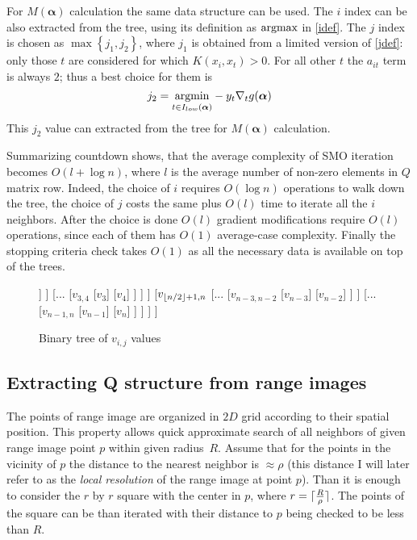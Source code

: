 For $M(\bm{\alpha})$ calculation the same data structure can be used. The $i$ index can be also extracted from the tree, using its definition as $\operatorname{argmax}$ in \ref{idef}. The $j$ index is chosen as $\max\left\{j_1, j_2\right\}$, where $j_1$ is obtained 
from a limited version of \ref{jdef}: only those $t$ are considered for which $K(x_i, x_t) > 0$. For all other $t$ the $a_{it}$ term is always $2$; thus a best choice for them is
\begin{equation}
j_2 = \underset{t \in I_{low}(\bm{\alpha})}{\operatorname{argmin}} -y_t \nabla_t g(\bm{\alpha})
\end{equation}
This $j_2$ value can extracted from the tree for $M(\bm{\alpha})$ calculation.

Summarizing countdown shows, that the average complexity of SMO iteration becomes $O(l + \log n)$, where $l$ is the average number of non-zero elements in $Q$ matrix row. Indeed, the choice of $i$ requires
$O(\log n)$ operations to walk down the tree, the choice of $j$ costs the same plus $O(l)$ time to iterate all the $i$ neighbors. After the choice is done $O(l)$ gradient modifications require $O(l)$ operations, since each of them has $O(1)$ average-case complexity. Finally the stopping criteria check takes $O(1)$ as all the necessary data is available on top of the trees.

\begin{figure}
\centering
\begin{forest}
[$v_{1,n}$, 
	[$v_{1,\Floor{n/2}}$
		[...
			[$v_{1,2}$
				[$v_1$]
				[$v_2$]
			]
		]
		[...
			[$v_{3,4}$
				[$v_3$]
				[$v_4$]
			]
		]
	]
	[$v_{\lfloor n/2 \rfloor+1							,n}$
		[...
			[$v_{n-3,n-2}$
				[$v_{n-3}$]
				[$v_{n-2}$]
			]
		]
		[...
			[$v_{n-1,n}$
				[$v_{n-1}$]
				[$v_{n}$]
			]
		]
	]
]
\end{forest}
\label{vtree}
\caption{Binary tree of $v_{i,j}$ values}
\end{figure}

\subsection{Extracting Q structure from range images}
The points of range image are organized in $2D$ grid according to their spatial position. This property allows quick approximate search of all neighbors of given range image point $p$ within given radius~$R$. Assume that for the points in the vicinity of $p$ the distance to the nearest neighbor is $\approx \rho$ (this distance I will later refer to as the \textit{local resolution} of the range image at point $p$). Than it is enough to consider the $r$ by $r$ square with the center in $p$, where $r=\lceil \frac{R}{\rho} \rceil$. The points of the square can be than iterated with their distance to $p$ being checked to be less than $R$.


